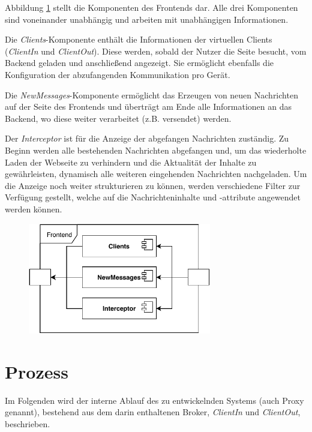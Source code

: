     
    Abbildung \ref{fig:system_frontend} stellt die Komponenten des Frontends dar. Alle drei Komponenten sind voneinander unabhängig und arbeiten mit unabhängigen Informationen.
    
    Die \emph{Clients}-Komponente enthält die Informationen der virtuellen Clients (\emph{ClientIn} und \emph{ClientOut}). Diese werden, sobald der Nutzer die Seite besucht, vom Backend geladen und anschließend angezeigt. Sie ermöglicht ebenfalls die Konfiguration der abzufangenden Kommunikation pro Gerät.
    
    Die \emph{NewMessages}-Komponente ermöglicht das Erzeugen von neuen Nachrichten auf der Seite des Frontends und überträgt am Ende alle Informationen an das Backend, wo diese weiter verarbeitet (z.B. versendet) werden.
    
    Der \emph{Interceptor} ist für die Anzeige der abgefangen Nachrichten zuständig. Zu Beginn werden alle bestehenden Nachrichten abgefangen und, um das wiederholte Laden der Webseite zu verhindern und die Aktualität der Inhalte zu gewährleisten, dynamisch alle weiteren eingehenden Nachrichten nachgeladen. Um die Anzeige noch weiter strukturieren zu können, werden verschiedene Filter zur Verfügung gestellt, welche auf die Nachrichteninhalte und -attribute angewendet werden können.
    \begin{figure}[h]%
        \centering
        \includegraphics[width=8cm]{tex/bilder/4_konzept/Systemdiagramm_Konzept_Frontend.pdf}
        \label{fig:system_frontend}
    \end{figure}

\section{Prozess}
    Im Folgenden wird der interne Ablauf des zu entwickelnden Systems (auch Proxy genannt), bestehend aus dem darin enthaltenen Broker, \emph{ClientIn} und \emph{ClientOut}, beschrieben.

